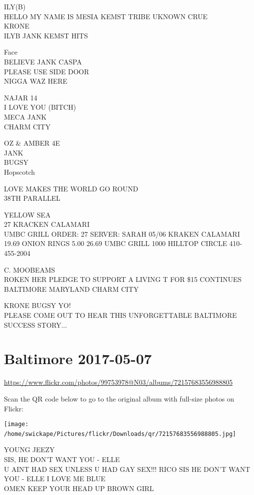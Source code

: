 \documentclass[10pt,letterpaper]{article}
\begin{document}
ILY(B)\\
HELLO MY NAME IS MESIA KEMST TRIBE UKNOWN CRUE\\
KRONE\\
ILYB JANK KEMST HITS

Face\\
BELIEVE JANK CASPA\\
PLEASE USE SIDE DOOR\\
NIGGA WAZ HERE

NAJAR 14\\
I LOVE YOU (BITCH)\\
MECA JANK\\
CHARM CITY

OZ \& AMBER 4E\\
JANK\\
BUGSY\\
Hopscotch

LOVE MAKES THE WORLD GO ROUND\\
38TH PARALLEL

YELLOW SEA\\
27 KRACKEN CALAMARI\\
UMBC GRILL ORDER: 27 SERVER: SARAH 05/06 KRAKEN CALAMARI 19.69 ONION RINGS 5.00 26.69 UMBC GRILL 1000 HILLTOP CIRCLE 410{-}455{-}2004

C. MOOBEAMS\\
ROKEN HER PLEDGE TO SUPPORT A LIVING T FOR \$15 CONTINUES\\
BALTIMORE MARYLAND CHARM CITY

KRONE BUGSY YO!\\
PLEASE COME OUT TO HEAR THIS UNFORGETTABLE BALTIMORE SUCCESS STORY...
\

\section*{Baltimore 2017-05-07}

\url{https://www.flickr.com/photos/99753978@N03/albums/72157683556988805}

Scan the QR code below to go to the original album with full-size photos on Flickr:

\texttt{[image: /home/swickape/Pictures/flickr/Downloads/qr/72157683556988805.jpg]}
\

YOUNG JEEZY\\
SIS, HE DON'T WANT YOU {-} ELLE\\
U AINT HAD SEX UNLESS U HAD GAY SEX!!! RICO SIS HE DON'T WANT YOU {-} ELLE I LOVE ME BLUE\\
OMEN KEEP YOUR HEAD UP BROWN GIRL
\end{document}
